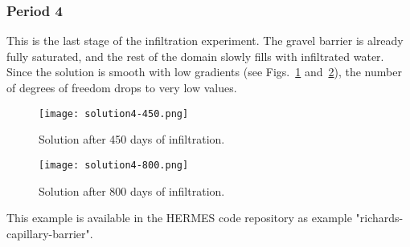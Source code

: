 \documentclass[final,3p,times,twocolumn]{elsarticle}
\begin{document}

\subsubsection{Period 4}

This is the last stage of the infiltration experiment. The gravel barrier is already 
fully saturated, and the rest of the domain  slowly fills with infiltrated water. Since
the solution is smooth with low gradients (see Figs.~\ref{fig:solution4.1} and~\ref{fig:solution4.2}), 
the number of degrees of freedom drops to very low values.


\begin{figure}[!htb]
\begin{center}
\vspace{0mm}
\texttt{[image: solution4-450.png]}
\end{center}
\vspace{-4mm}
\caption{Solution after 450 days of infiltration. }
\label{fig:solution4.1}
\end{figure}

\begin{figure}[!htb]
\vspace{4mm}
\begin{center}
\texttt{[image: solution4-800.png]}
\end{center}
\vspace{-4mm}
\caption{Solution after 800 days of infiltration.}
\label{fig:solution4.2}
\vspace{-0.4cm}
\end{figure}

This example is available in the HERMES code repository \cite{hermes-repo}
as example "richards-capillary-barrier".

\end{document}
